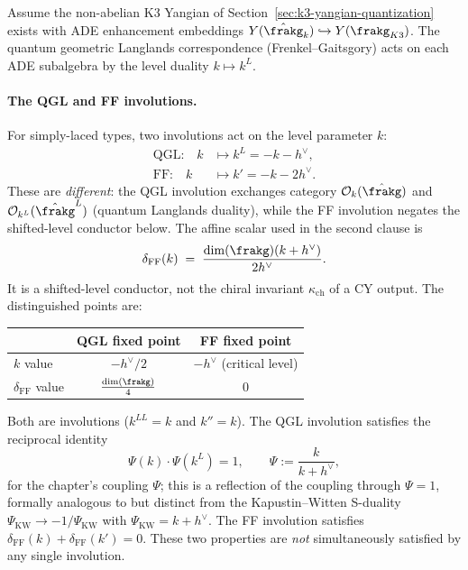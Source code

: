 Assume the non-abelian K3 Yangian of
Section~\ref{sec:k3-yangian-quantization} exists with ADE enhancement
embeddings \(Y(\hat{\frakg}_k)\hookrightarrow Y(\frakg_{K3})\). The
quantum geometric Langlands correspondence (Frenkel--Gaitsgory) acts on
each ADE subalgebra by the level duality \(k \mapsto k^L\).

\paragraph{The QGL and FF involutions.}
For simply-laced types, two involutions act on the level parameter $k$:
\begin{align}
 \text{QGL:}\quad k &\mapsto k^L = -k - h^\vee, \label{eq:qgl-involution} \\
 \text{FF:}\quad k &\mapsto k' = -k - 2h^\vee. \label{eq:ff-involution}
\end{align}
These are \emph{different}: the QGL involution exchanges category $\mathcal{O}_k(\hat{\frakg})$ and $\mathcal{O}_{k^L}(\hat{\frakg}^L)$ (quantum Langlands duality), while the FF involution negates the shifted-level conductor below.
The affine scalar used in the second clause is
\[
 \delta_{\mathrm{FF}}(k) \;=\; \frac{\dim(\frakg)(k+h^\vee)}{2h^\vee}.
\]
It is a shifted-level conductor, not the chiral invariant $\kappa_{\mathrm{ch}}$ of a CY output. The distinguished points are:
\begin{center}
\begin{tabular}{lcc}
 & QGL fixed point & FF fixed point \\
\hline
$k$ value & $-h^\vee/2$ & $-h^\vee$ (critical level) \\
$\delta_{\mathrm{FF}}$ value & $\frac{\dim(\frakg)}{4}$ & $0$ \\
\end{tabular}
\end{center}
Both are involutions ($k^{LL} = k$ and $k'' = k$). The QGL involution satisfies the reciprocal identity
\[
 \Psi(k) \cdot \Psi(k^L) = 1, \qquad \Psi := \frac{k}{k + h^\vee},
\]
for the chapter's coupling $\Psi$; this is a reflection of the coupling through $\Psi = 1$, formally analogous to but distinct from the Kapustin--Witten S-duality $\Psi_{\mathrm{KW}} \to -1/\Psi_{\mathrm{KW}}$ with $\Psi_{\mathrm{KW}} = k + h^\vee$. The FF involution satisfies $\delta_{\mathrm{FF}}(k) + \delta_{\mathrm{FF}}(k') = 0$. These two properties are \emph{not} simultaneously satisfied by any single involution.

